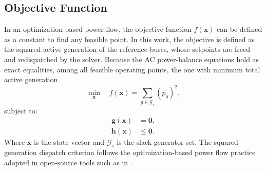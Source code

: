 \documentclass[letterpaper,journal]{IEEEtran}
\begin{document}
\subsection{Objective Function}
In an optimization-based power flow, the objective function $f(\mathbf{x})$ can be defined as a constant to find any feasible
point. In this work, the objective is defined as the squared active generation of the reference buses, whose setpoints are
freed and redispatched by the solver. Because the AC power-balance equations hold as exact equalities, among
all feasible operating points, the one with minimum total active generation
\begin{equation}
	\min_{\mathbf{x}} \quad f(\mathbf{x}) = \sum_{g \in \mathcal{G}_s} (p_g)^2,
	\label{eq:obj_squared_generation}
\end{equation}
subject to:
\begin{align}
	\mathbf{g}(\mathbf{x}) & = \mathbf{0}, \label{eq:equality_cons}    \\
	\mathbf{h}(\mathbf{x}) & \leq \mathbf{0}. \label{eq:inequality_cons}
\end{align}
Where $\mathbf{x}$ is the state vector and $\mathcal{G}_s$ is the slack-generator set. The squared-generation dispatch criterion
follows the optimization-based power flow practice adopted in open-source tools such as in \cite{ref11}.
\end{document}
